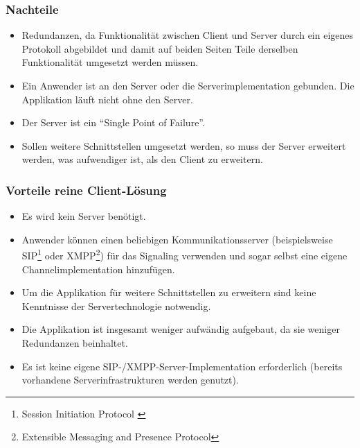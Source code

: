 		\subsubsection{Nachteile}
		\begin{itemize}
			\item Redundanzen, da Funktionalität zwischen Client und Server durch
			ein eigenes Protokoll abgebildet und damit auf beiden Seiten Teile derselben
			Funktionalität umgesetzt werden müssen.
			\item Ein Anwender ist an den Server oder die Serverimplementation gebunden.
			Die Applikation läuft nicht ohne den Server.
			\item Der Server ist ein "`Single Point of Failure"'.
			\item Sollen weitere Schnittstellen umgesetzt werden, so muss der Server
			erweitert werden, was aufwendiger ist, als den Client zu erweitern.
		\end{itemize}


		\subsubsection{Vorteile reine Client-Lösung}
		\begin{itemize}
			\item Es wird kein Server benötigt.
			\item Anwender können einen beliebigen Kommunikationsserver
			(beispielsweise SIP\footnote{Session Initiation Protocol \cite{IETF-SDP-RFC}} oder
			XMPP\footnote{Extensible Messaging and Presence Protocol}) für das
			Signaling verwenden und sogar selbst eine eigene Channelimplementation
			hinzufügen.
			\item Um die Applikation für weitere Schnittstellen zu erweitern sind keine
			Kenntnisse der Servertechnologie notwendig.
			\item Die Applikation ist insgesamt weniger aufwändig aufgebaut, da sie
			weniger Redundanzen beinhaltet.
			\item Es ist keine eigene SIP-/XMPP-Server-Implementation erforderlich
			(bereits vorhandene Serverinfrastrukturen werden genutzt).
		\end{itemize}
